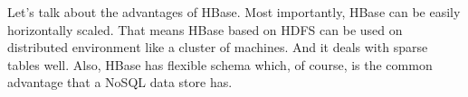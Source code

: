 \documentclass[12pt, a4paper]{article}
\begin{document}
Let's talk about the advantages of HBase. Most importantly, HBase can be easily horizontally scaled. That means HBase based on HDFS can be used on distributed environment like a cluster of machines. And it deals with sparse tables well. Also, HBase has flexible schema which, of course, is the common advantage that a NoSQL data store has.



\end{document}

